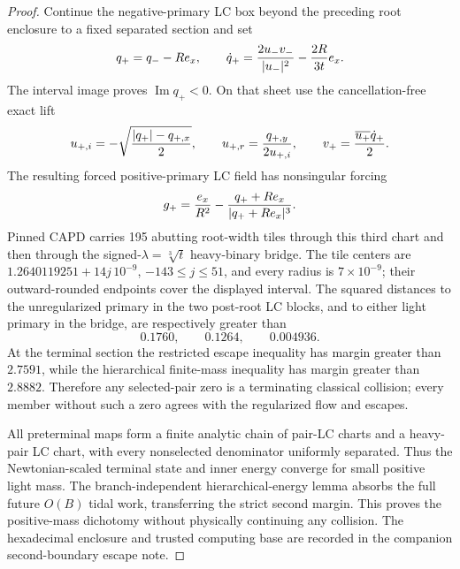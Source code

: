 \documentclass[11pt]{article}
\begin{document}
\begin{proof}
Continue the negative-primary LC box beyond the preceding root enclosure to a
fixed separated section and set
\[
 q_+=q_--Re_x,\qquad
 \dot q_+={2u_-v_-\over|u_-|^2}-{2R\over3t}e_x.
\]
The interval image proves $\operatorname{Im}q_+<0$.  On that sheet use the
cancellation-free exact lift
\[
 u_{+,i}=-\sqrt{{|q_+|-q_{+,x}\over2}},\qquad
 u_{+,r}={q_{+,y}\over2u_{+,i}},\qquad
 v_+={\overline{u_+}\dot q_+\over2}.
\]
The resulting forced positive-primary LC field has nonsingular forcing
\[
 g_+={e_x\over R^2}-{q_++Re_x\over|q_++Re_x|^3}.
\]
Pinned CAPD carries 195 abutting root-width tiles through this third chart and
then through the signed-$\lambda=\sqrt[3]t$ heavy-binary bridge.  The tile
centers are $1.2640119251+14j\,10^{-9}$, $-143\le j\le51$, and every radius is
$7\times10^{-9}$; their outward-rounded endpoints cover the displayed
interval.  The squared
distances to the unregularized primary in the two post-root LC blocks, and to
either light primary in the bridge, are respectively greater than
\[
 0.1760,\qquad0.1264,\qquad0.004936.
\]
At the terminal section the restricted escape inequality has margin greater
than $2.7591$, while the hierarchical finite-mass inequality has margin
greater than $2.8882$.  Therefore any selected-pair zero is a terminating
classical collision; every member without such a zero agrees with the
regularized flow and escapes.

All preterminal maps form a finite analytic chain of pair-LC charts and a
heavy-pair LC chart, with every nonselected denominator uniformly separated.
Thus the Newtonian-scaled terminal state and inner energy converge for small
positive light mass.  The branch-independent hierarchical-energy lemma
absorbs the full future $O(B)$ tidal work, transferring the strict second
margin.  This proves the positive-mass dichotomy without physically
continuing any collision.  The hexadecimal enclosure and trusted computing
base are recorded in the companion second-boundary escape note.
\end{proof}
\end{document}
